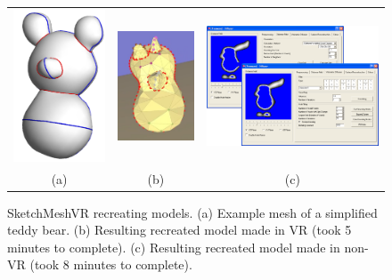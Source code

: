 \begin{figure}[!h]
    \centering
    \setlength{\tabcolsep}{0.0130\linewidth}
    \begin{tabular}{@{}ccc@{}}
    \includegraphics[width=0.3\linewidth]{figures/example_model_figure}&
  	\includegraphics[width=0.3\linewidth]{figures/results_teddy_model1}&
  	\includegraphics[width=0.3\linewidth]{figures/voldiff_ui}\\

    (a)&(b)&(c)\\
    \end{tabular}
    \caption[SketchMeshVR simplified teddy bear model]{SketchMeshVR recreating models.
    	  \textup{(a)} Example mesh of a simplified teddy bear.
	  \textup{(b)} Resulting recreated model made in VR (took 5 minutes to complete).
	  \textup{(c)} Resulting recreated model made in non-VR (took 8 minutes to complete).
      \label{fig:recreate_teddy}}
\end{figure}


